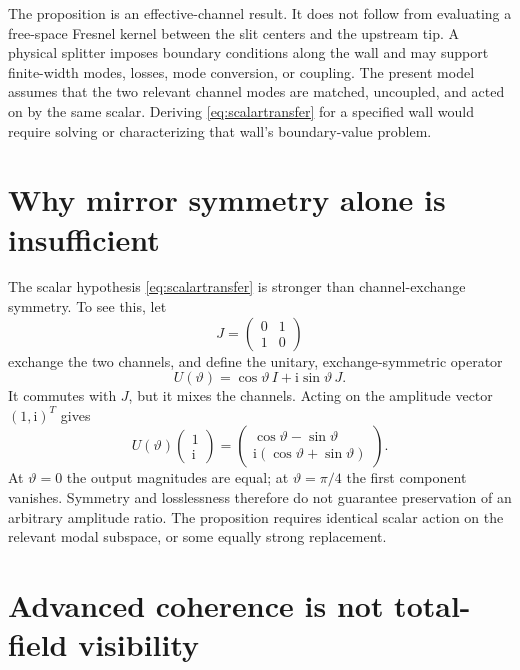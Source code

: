 \documentclass[11pt]{article}
\newcommand{\ii}{\mathrm{i}}
\begin{document}
The proposition is an effective-channel result.  It does not follow from evaluating a free-space Fresnel kernel between the slit centers and the upstream tip.  A physical splitter imposes boundary conditions along the wall and may support finite-width modes, losses, mode conversion, or coupling.  The present model assumes that the two relevant channel modes are matched, uncoupled, and acted on by the same scalar.  Deriving \eqref{eq:scalartransfer} for a specified wall would require solving or characterizing that wall's boundary-value problem.

\section{Why mirror symmetry alone is insufficient}\label{sec:exchange}

The scalar hypothesis \eqref{eq:scalartransfer} is stronger than channel-exchange symmetry.  To see this, let
\begin{equation}
 J=
 \begin{pmatrix}
 0&1\\
 1&0
 \end{pmatrix}
\end{equation}
exchange the two channels, and define the unitary, exchange-symmetric operator
\begin{equation}
 U(\vartheta)=\cos\vartheta\,I+\ii\sin\vartheta\,J.
\end{equation}
It commutes with $J$, but it mixes the channels.  Acting on the amplitude vector $(1,\ii)^T$ gives
\begin{equation}
 U(\vartheta)
 \begin{pmatrix}1\\ \ii\end{pmatrix}
 =
 \begin{pmatrix}
 \cos\vartheta-\sin\vartheta\\
 \ii(\cos\vartheta+\sin\vartheta)
 \end{pmatrix}.
\end{equation}
At $\vartheta=0$ the output magnitudes are equal; at $\vartheta=\pi/4$ the first component vanishes.  Symmetry and losslessness therefore do not guarantee preservation of an arbitrary amplitude ratio.  The proposition requires identical scalar action on the relevant modal subspace, or some equally strong replacement.

\section{Advanced coherence is not total-field visibility}\label{sec:total}
\end{document}

